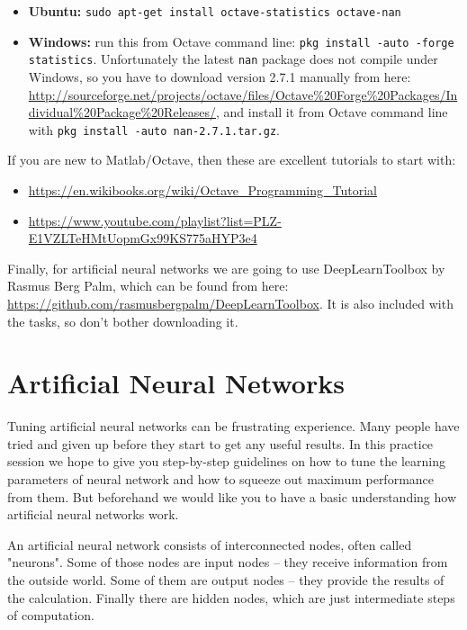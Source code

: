 \documentclass[a4paper,11pt]{article}
\begin{document}
\begin{itemize}
	\item \textbf{Ubuntu:} \texttt{sudo apt-get install octave-statistics octave-nan}
	\item \textbf{Windows:} run this from Octave command line: \texttt{pkg install -auto -forge statistics}. Unfortunately the latest \texttt{nan} package does not compile under Windows, so you have to download version 2.7.1 manually from here: \url{http://sourceforge.net/projects/octave/files/Octave%20Forge%20Packages/Individual%20Package%20Releases/}, and install it from Octave command line with \texttt{pkg install -auto nan-2.7.1.tar.gz}.
\end{itemize}

If you are new to Matlab/Octave, then these are excellent tutorials to start with:
\begin{itemize}
	\item \url{https://en.wikibooks.org/wiki/Octave_Programming_Tutorial}
	\item \url{https://www.youtube.com/playlist?list=PLZ-E1VZLTeHMtUopmGx99KS775aHYP3e4}
\end{itemize}

Finally, for artificial neural networks we are going to use DeepLearnToolbox by Rasmus Berg Palm, which can be found from here: \url{https://github.com/rasmusbergpalm/DeepLearnToolbox}. It is also included with the tasks, so don't bother downloading it.

%
%
\section{Artificial Neural Networks}

Tuning artificial neural networks can be frustrating experience. Many people have tried and given up before they start to get any useful results. In this practice session we hope to give you step-by-step guidelines on how to tune the learning parameters of neural network and how to squeeze out maximum performance from them. But beforehand we would like you to have a basic understanding how artificial neural networks work.

An artificial neural network consists of interconnected nodes, often called "neurons". Some of those nodes are input nodes -- they receive information from the outside world. Some of them are output nodes -- they provide the results of the calculation. Finally there are hidden nodes, which are just intermediate steps of computation.
\end{document}
